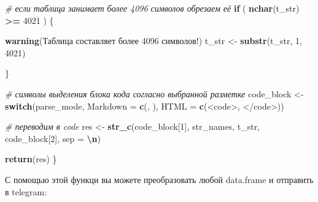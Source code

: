 \documentclass[
]{book}
\newenvironment{Shaded}{\begin{snugshade}}{\end{snugshade}}
\newcommand{\AttributeTok}[1]{\textcolor[rgb]{0.13,0.29,0.53}{#1}}
\newcommand{\CommentTok}[1]{\textcolor[rgb]{0.56,0.35,0.01}{\textit{#1}}}
\newcommand{\ControlFlowTok}[1]{\textcolor[rgb]{0.13,0.29,0.53}{\textbf{#1}}}
\newcommand{\DecValTok}[1]{\textcolor[rgb]{0.00,0.00,0.81}{#1}}
\newcommand{\FunctionTok}[1]{\textcolor[rgb]{0.13,0.29,0.53}{\textbf{#1}}}
\newcommand{\NormalTok}[1]{#1}
\newcommand{\OtherTok}[1]{\textcolor[rgb]{0.56,0.35,0.01}{#1}}
\newcommand{\SpecialCharTok}[1]{\textcolor[rgb]{0.81,0.36,0.00}{\textbf{#1}}}
\newcommand{\StringTok}[1]{\textcolor[rgb]{0.31,0.60,0.02}{#1}}
\begin{document}
\begin{Shaded}
\begin{Highlighting}[]
  \CommentTok{\# если таблица занимает более 4096 символов обрезаем её}
  \ControlFlowTok{if}\NormalTok{ ( }\FunctionTok{nchar}\NormalTok{(t\_str) }\SpecialCharTok{\textgreater{}=} \DecValTok{4021}\NormalTok{ ) \{}
    
    \FunctionTok{warning}\NormalTok{(}\StringTok{\textquotesingle{}Таблица составляет более 4096 символов!\textquotesingle{}}\NormalTok{)}
\NormalTok{    t\_str }\OtherTok{\textless{}{-}} \FunctionTok{substr}\NormalTok{(t\_str, }\DecValTok{1}\NormalTok{, }\DecValTok{4021}\NormalTok{)}
    
\NormalTok{  \}}
  
  \CommentTok{\# символы выделения блока кода согласно выбранной разметке}
\NormalTok{  code\_block }\OtherTok{\textless{}{-}} \ControlFlowTok{switch}\NormalTok{(parse\_mode, }
                       \StringTok{\textquotesingle{}Markdown\textquotesingle{}} \OtherTok{=} \FunctionTok{c}\NormalTok{(}\StringTok{\textquotesingle{}\textasciigrave{}\textasciigrave{}\textasciigrave{}\textquotesingle{}}\NormalTok{, }\StringTok{\textquotesingle{}\textasciigrave{}\textasciigrave{}\textasciigrave{}\textquotesingle{}}\NormalTok{),}
                       \StringTok{\textquotesingle{}HTML\textquotesingle{}} \OtherTok{=} \FunctionTok{c}\NormalTok{(}\StringTok{\textquotesingle{}\textless{}code\textgreater{}\textquotesingle{}}\NormalTok{, }\StringTok{\textquotesingle{}\textless{}/code\textgreater{}\textquotesingle{}}\NormalTok{))}
           
  \CommentTok{\# переводим в code}
\NormalTok{  res }\OtherTok{\textless{}{-}} \FunctionTok{str\_c}\NormalTok{(code\_block[}\DecValTok{1}\NormalTok{], str\_names, t\_str, code\_block[}\DecValTok{2}\NormalTok{], }\AttributeTok{sep =} \StringTok{\textquotesingle{}}\SpecialCharTok{\textbackslash{}n}\StringTok{\textquotesingle{}}\NormalTok{)}
  
  \FunctionTok{return}\NormalTok{(res)}
\NormalTok{\}}
\end{Highlighting}
\end{Shaded}

С помощью этой функци вы можете преобразовать любой data.frame и отправить в telegram:

\begin{Shaded}
\end{Shaded}
\end{document}
